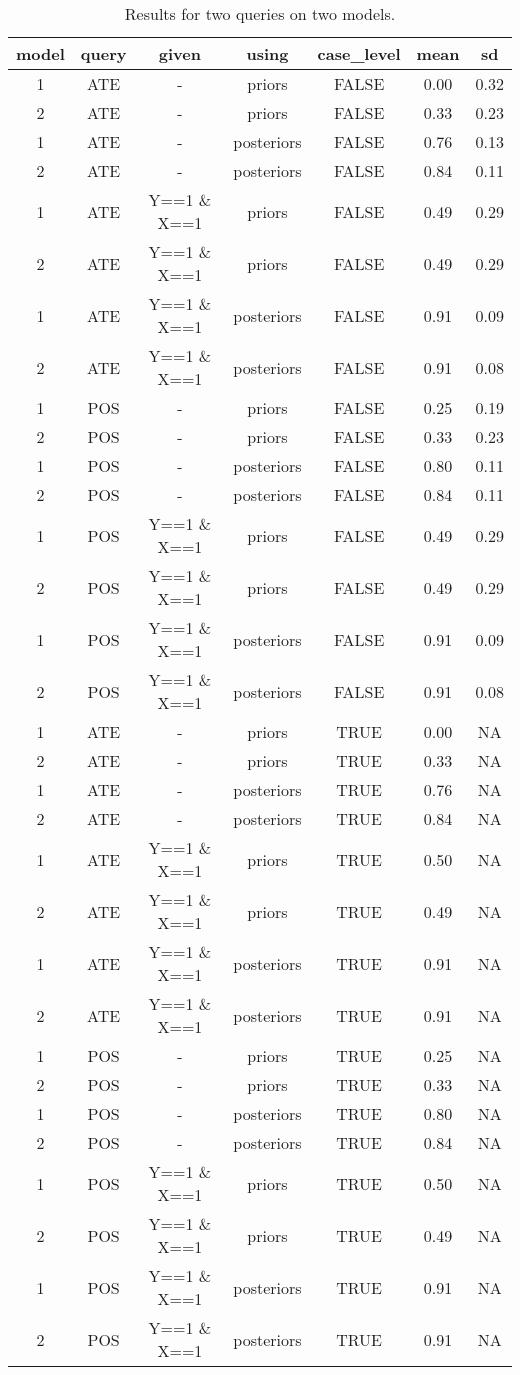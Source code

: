 \documentclass[
  11pt,
  article]{jss}
\begin{document}
\hypertarget{tbl-batch-query}{}
\begin{longtable}{ccccccc}
\caption{\label{tbl-batch-query}Results for two queries on two models. }\tabularnewline

\toprule
model & query & given & using & case\_level & mean & sd\\
\midrule
1 & ATE & - & priors & FALSE & 0.00 & 0.32\\
2 & ATE & - & priors & FALSE & 0.33 & 0.23\\
1 & ATE & - & posteriors & FALSE & 0.76 & 0.13\\
2 & ATE & - & posteriors & FALSE & 0.84 & 0.11\\
1 & ATE & Y==1 \& X==1 & priors & FALSE & 0.49 & 0.29\\
2 & ATE & Y==1 \& X==1 & priors & FALSE & 0.49 & 0.29\\
1 & ATE & Y==1 \& X==1 & posteriors & FALSE & 0.91 & 0.09\\
2 & ATE & Y==1 \& X==1 & posteriors & FALSE & 0.91 & 0.08\\
1 & POS & - & priors & FALSE & 0.25 & 0.19\\
2 & POS & - & priors & FALSE & 0.33 & 0.23\\
1 & POS & - & posteriors & FALSE & 0.80 & 0.11\\
2 & POS & - & posteriors & FALSE & 0.84 & 0.11\\
1 & POS & Y==1 \& X==1 & priors & FALSE & 0.49 & 0.29\\
2 & POS & Y==1 \& X==1 & priors & FALSE & 0.49 & 0.29\\
1 & POS & Y==1 \& X==1 & posteriors & FALSE & 0.91 & 0.09\\
2 & POS & Y==1 \& X==1 & posteriors & FALSE & 0.91 & 0.08\\
1 & ATE & - & priors & TRUE & 0.00 & NA\\
2 & ATE & - & priors & TRUE & 0.33 & NA\\
1 & ATE & - & posteriors & TRUE & 0.76 & NA\\
2 & ATE & - & posteriors & TRUE & 0.84 & NA\\
1 & ATE & Y==1 \& X==1 & priors & TRUE & 0.50 & NA\\
2 & ATE & Y==1 \& X==1 & priors & TRUE & 0.49 & NA\\
1 & ATE & Y==1 \& X==1 & posteriors & TRUE & 0.91 & NA\\
2 & ATE & Y==1 \& X==1 & posteriors & TRUE & 0.91 & NA\\
1 & POS & - & priors & TRUE & 0.25 & NA\\
2 & POS & - & priors & TRUE & 0.33 & NA\\
1 & POS & - & posteriors & TRUE & 0.80 & NA\\
2 & POS & - & posteriors & TRUE & 0.84 & NA\\
1 & POS & Y==1 \& X==1 & priors & TRUE & 0.50 & NA\\
2 & POS & Y==1 \& X==1 & priors & TRUE & 0.49 & NA\\
1 & POS & Y==1 \& X==1 & posteriors & TRUE & 0.91 & NA\\
2 & POS & Y==1 \& X==1 & posteriors & TRUE & 0.91 & NA\\
\bottomrule
\end{longtable}
\end{document}

